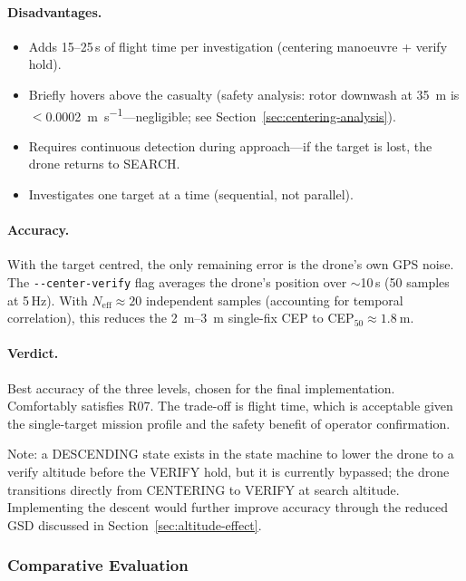 \paragraph{Disadvantages.}
\begin{itemize}
  \item Adds 15--25\,s of flight time per investigation (centering manoeuvre + verify hold).
  \item Briefly hovers above the casualty (safety analysis: rotor downwash at \SI{35}{\metre} is $<$\SI{0.0002}{\metre\per\second}---negligible; see Section~\ref{sec:centering-analysis}).
  \item Requires continuous detection during approach---if the target is lost, the drone returns to SEARCH.
  \item Investigates one target at a time (sequential, not parallel).
\end{itemize}

\paragraph{Accuracy.}  With the target centred, the only remaining error is the drone's own GPS noise.  The \texttt{-{}-center-verify} flag averages the drone's position over $\sim$10\,s (50 samples at 5\,Hz).  With $N_\mathrm{eff} \approx 20$ independent samples (accounting for temporal correlation), this reduces the \SIrange{2}{3}{\metre} single-fix CEP to CEP$_{50} \approx \SI{1.8}{\metre}$.

\paragraph{Verdict.}  Best accuracy of the three levels, chosen for the final implementation.  Comfortably satisfies R07.  The trade-off is flight time, which is acceptable given the single-target mission profile and the safety benefit of operator confirmation.

\noindent Note: a DESCENDING state exists in the state machine to lower the drone to a verify altitude before the VERIFY hold, but it is currently bypassed; the drone transitions directly from CENTERING to VERIFY at search altitude.  Implementing the descent would further improve accuracy through the reduced GSD discussed in Section~\ref{sec:altitude-effect}.

\subsubsection{Comparative Evaluation}\label{sec:two-approaches}

